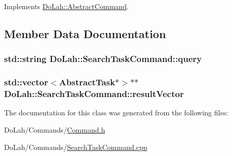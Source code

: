 Implements \hyperlink{class_do_lah_1_1_abstract_command_a9760328f2d6b85d8edc803a97a29dfc0}{Do\+Lah\+::\+Abstract\+Command}.



\subsection{Member Data Documentation}
\hypertarget{class_do_lah_1_1_search_task_command_a59f503319380f50d33eeb389f2e3208b}{}
\subsubsection[{query}]{\setlength{\rightskip}{0pt plus 5cm}std\+::string Do\+Lah\+::\+Search\+Task\+Command\+::query\hspace{0.3cm}{\ttfamily [private]}}\label{class_do_lah_1_1_search_task_command_a59f503319380f50d33eeb389f2e3208b}
\hypertarget{class_do_lah_1_1_search_task_command_ab57f29ebbae60c4a5d71fdf75a8621cd}{}
\subsubsection[{result\+Vector}]{\setlength{\rightskip}{0pt plus 5cm}std\+::vector$<${\bf Abstract\+Task}$\ast$$>$$\ast$$\ast$ Do\+Lah\+::\+Search\+Task\+Command\+::result\+Vector\hspace{0.3cm}{\ttfamily [private]}}\label{class_do_lah_1_1_search_task_command_ab57f29ebbae60c4a5d71fdf75a8621cd}


The documentation for this class was generated from the following files\+:\begin{DoxyCompactItemize}
\item 
Do\+Lah/\+Commands/\hyperlink{_command_8h}{Command.\+h}\item 
Do\+Lah/\+Commands/\hyperlink{_search_task_command_8cpp}{Search\+Task\+Command.\+cpp}\end{DoxyCompactItemize}
